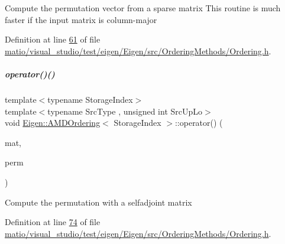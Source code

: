 Compute the permutation vector from a sparse matrix This routine is much faster if the input matrix is column-\/major 

Definition at line \hyperlink{matio_2visual__studio_2test_2eigen_2_eigen_2src_2_ordering_methods_2_ordering_8h_source_l00061}{61} of file \hyperlink{matio_2visual__studio_2test_2eigen_2_eigen_2src_2_ordering_methods_2_ordering_8h_source}{matio/visual\+\_\+studio/test/eigen/\+Eigen/src/\+Ordering\+Methods/\+Ordering.\+h}.

\mbox{\label{group___ordering_methods___module_a7f3fd7224b084f0f5655c97ea8eb6466}} 
\subparagraph{\texorpdfstring{operator()()}{operator()()}\hspace{0.1cm}{\footnotesize\ttfamily [3/4]}}
{\footnotesize\ttfamily template$<$typename Storage\+Index$>$ \\
template$<$typename Src\+Type , unsigned int Src\+Up\+Lo$>$ \\
void \hyperlink{group___ordering_methods___module_class_eigen_1_1_a_m_d_ordering}{Eigen\+::\+A\+M\+D\+Ordering}$<$ Storage\+Index $>$\+::operator() (\begin{DoxyParamCaption}\item[{const \hyperlink{group___sparse_core___module_class_eigen_1_1_sparse_self_adjoint_view}{Sparse\+Self\+Adjoint\+View}$<$ Src\+Type, Src\+Up\+Lo $>$ \&}]{mat,  }\item[{\hyperlink{group___core___module}{Permutation\+Type} \&}]{perm }\end{DoxyParamCaption})\hspace{0.3cm}{\ttfamily [inline]}}

Compute the permutation with a selfadjoint matrix 

Definition at line \hyperlink{matio_2visual__studio_2test_2eigen_2_eigen_2src_2_ordering_methods_2_ordering_8h_source_l00074}{74} of file \hyperlink{matio_2visual__studio_2test_2eigen_2_eigen_2src_2_ordering_methods_2_ordering_8h_source}{matio/visual\+\_\+studio/test/eigen/\+Eigen/src/\+Ordering\+Methods/\+Ordering.\+h}.


